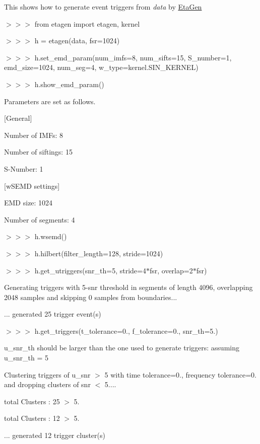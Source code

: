 \begin{DoxyItemize}
\item This shows how to generate event triggers from {\itshape data} by \hyperlink{namespaceEtaGen}{Eta\-Gen}\par
 $>$$>$$>$ from etagen import etagen, kernel

$>$$>$$>$ h = etagen(data, fsr=1024)

$>$$>$$>$ h.\-set\-\_\-emd\-\_\-param(num\-\_\-imfs=8, num\-\_\-sifts=15, S\-\_\-number=1, emd\-\_\-size=1024, num\-\_\-seg=4, w\-\_\-type=kernel.\-S\-I\-N\-\_\-\-K\-E\-R\-N\-E\-L)

$>$$>$$>$ h.\-show\-\_\-emd\-\_\-param()\par
 Parameters are set as follows.\par
 \mbox{[}General\mbox{]}\par
 Number of I\-M\-Fs\-: 8\par
 Number of siftings\-: 15\par
 S-\/\-Number\-: 1\par
 \mbox{[}w\-S\-E\-M\-D settings\mbox{]}\par
 E\-M\-D size\-: 1024\par
 Number of segments\-: 4

$>$$>$$>$ h.\-wsemd()

$>$$>$$>$ h.\-hilbert(filter\-\_\-length=128, stride=1024)

$>$$>$$>$ h.\-get\-\_\-utriggers(snr\-\_\-th=5, stride=4$\ast$fsr, overlap=2$\ast$fsr)\par
 Generating triggers with 5-\/snr threshold in segments of length 4096, overlapping 2048 samples and skipping 0 samples from boundaries...\par
 ... generated 25 trigger event(s)

$>$$>$$>$ h.\-get\-\_\-triggers(t\-\_\-tolerance=0., f\-\_\-tolerance=0., snr\-\_\-th=5.)\par
 u\-\_\-snr\-\_\-th should be larger than the one used to generate triggers\-: assuming u\-\_\-snr\-\_\-th = 5\par
 Clustering triggers of u\-\_\-snr $>$ 5 with time tolerance=0., frequency tolerance=0. and dropping clusters of snr $<$ 5....\par
 total Clusters \-: 25 $>$ 5.\par
 total Clusters \-: 12 $>$ 5.\par
 ... generated 12 trigger cluster(s)


\end{DoxyItemize}
